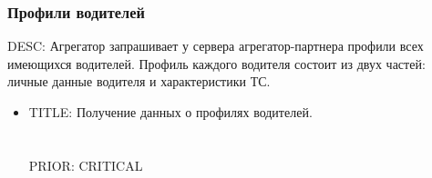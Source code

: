 		\subsubsection{Профили водителей} \label{aggregator_api_for_ts_drivers_profiles}

			DESC: Агрегатор запрашивает у сервера агрегатор-партнера профили всех имеющихся водителей. Профиль каждого водителя состоит из двух частей: личные данные водителя и характеристики ТС.

			\begin{itemize}

				\item {

					TITLE: Получение данных о профилях водителей.\\
					\\
					\\
					PRIOR: CRITICAL\\
				}

			\end{itemize}

